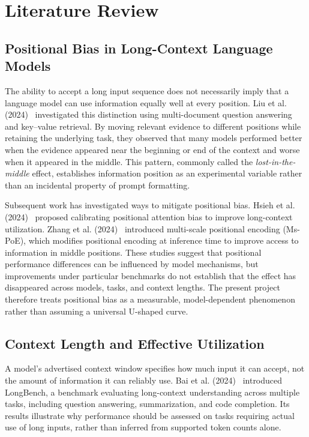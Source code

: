 
\section{Literature Review}
\label{sec:literature-review}

\subsection{Positional Bias in Long-Context Language Models}

The ability to accept a long input sequence does not necessarily imply that a
language model can use information equally well at every position. Liu et al.
(2024)~\cite{liu2024lost} investigated this distinction using multi-document
question answering and key--value retrieval. By moving relevant evidence to
different positions while retaining the underlying task, they observed that
many models performed better when the evidence appeared near the beginning or
end of the context and worse when it appeared in the middle. This pattern,
commonly called the \emph{lost-in-the-middle} effect, establishes information
position as an experimental variable rather than an incidental property of
prompt formatting.

Subsequent work has investigated ways to mitigate positional bias. Hsieh et al.
(2024)~\cite{hsieh2024found} proposed calibrating positional attention bias to
improve long-context utilization. Zhang et al. (2024)~\cite{zhang2024found}
introduced multi-scale positional encoding (Ms-PoE), which modifies positional
encoding at inference time to improve access to information in middle
positions. These studies suggest that positional performance differences can be
influenced by model mechanisms, but improvements under particular benchmarks do
not establish that the effect has disappeared across models, tasks, and context
lengths. The present project therefore treats positional bias as a measurable,
model-dependent phenomenon rather than assuming a universal U-shaped curve.

\subsection{Context Length and Effective Utilization}

A model's advertised context window specifies how much input it can accept, not
the amount of information it can reliably use. Bai et al.
(2024)~\cite{bai2024longbench} introduced LongBench, a benchmark evaluating
long-context understanding across multiple tasks, including question answering,
summarization, and code completion. Its results illustrate why performance
should be assessed on tasks requiring actual use of long inputs, rather than
inferred from supported token counts alone.

